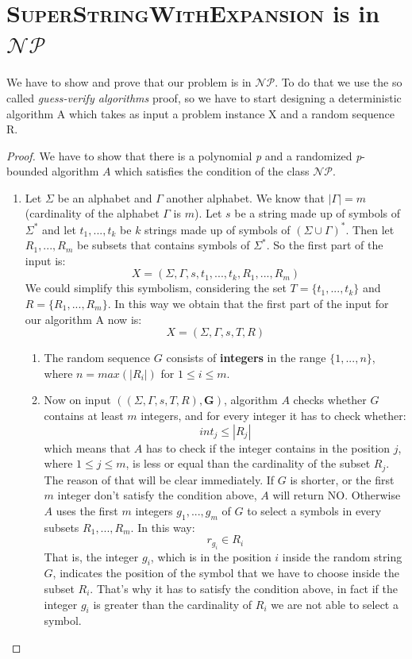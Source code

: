 \documentclass[paper=a4, fontsize=11pt]{scrartcl}
\numberwithin{equation}{section}		%
\numberwithin{figure}{section}			%
\numberwithin{table}{section}				%
\begin{document}
\section{\textsc{SuperStringWithExpansion} is in $\mathcal{NP}$}
We have to show and prove that our problem is in $\mathcal{NP}$. To do that we use the so called \textit{guess-verify algorithms} proof, so we have to start designing a deterministic algorithm A which takes as input a problem instance X and a random sequence R.

\begin{proof}
	We have to show that there is a polynomial \textit{p} and a randomized \textit{p}-bounded algorithm $A$ which satisfies the condition of the class $\mathcal{NP}$.  
	
	\begin{enumerate}
		\item Let $\Sigma$ be an alphabet and $\Gamma$ another alphabet. We know that $|\Gamma|=m$ (cardinality of the alphabet $\Gamma$ is $m$). Let $s$ be a string made up of symbols of $\Sigma^*$ and let $t_1,...,t_k$ be $k$ strings made up of symbols of $(\Sigma \cup \Gamma)^*$. Then let $R_1,...,R_m$ be subsets that contains symbols of $\Sigma^*$. So the first part of the input is:
		$$ X = (\Sigma,\Gamma,s,t_1,...,t_k,R_1,...,R_m) $$
		We could simplify this symbolism, considering the set $T=\{t_1,...,t_k\}$ and $R=\{R_1,...,R_m\}$. In this way we obtain that the first part of the input for our algorithm A now is:
		$$ X = (\Sigma,\Gamma,s,T,R) $$
        \begin{enumerate}
        	\item The random sequence $G$ consists of \textbf{integers} in the range $\{1,...,n\}$, where $n=max({|R_i|})$ for $1 \leq i \leq m$.
        	
        	\item Now on input $((\Sigma,\Gamma,s,T,R),\textbf{G})$, algorithm $A$ checks whether $G$ contains at least $m$ integers, and for every integer it has to check whether:
        	$$ int_j \leq |R_j| $$
        	which means that $A$ has to check if the integer contains in the position $j$, where $1 \leq j \leq m$, is less or equal than the cardinality of the subset $R_j$. The reason of that will be clear immediately. \newline
        	If $G$ is shorter, or the first $m$ integer don't satisfy the condition above, $A$ will return NO. Otherwise $A$ uses the first $m$ integers $g_1,...,g_m$ of $G$ to select a symbols in every subsets $R_1,...,R_m$. In this way:
        	$$ r_{g_i} \in R_i$$
        	That is, the integer $g_i$, which is in the position $i$ inside the random string $G$, indicates the position of the symbol that we have to choose inside the subset $R_i$. That's why it has to satisfy the condition above, in fact if the integer $g_i$ is greater than the cardinality of $R_i$ we are not able to select a symbol. 
        	

\end{enumerate}
\end{enumerate}
\end{proof}
\end{document}

